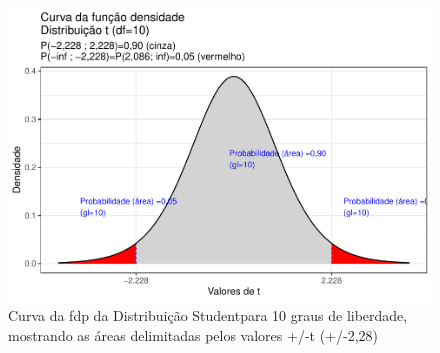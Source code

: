 \documentclass[
]{book}
\begin{document}
\begin{figure}

{\centering \includegraphics{apostila_files/figure-latex/fig27-1} 

}

\caption{Curva da fdp da Distribuição Studentpara 10 graus de liberdade, mostrando as áreas delimitadas pelos valores +/-t (+/-2,28)}\label{fig:fig27}
\end{figure}

\hfill\break
\end{document}
